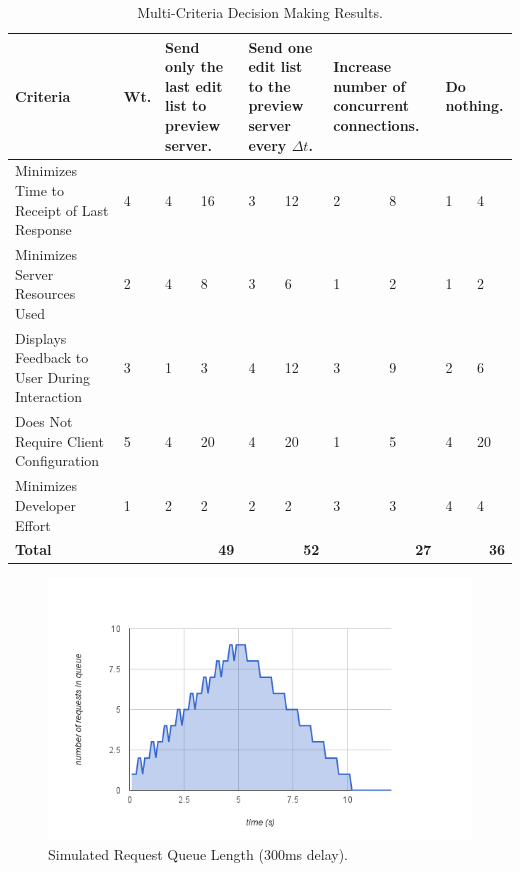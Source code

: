\documentclass[se,resubmit]{uw-wkrpt}
\begin{document}
\begin{table}
  \caption{Multi-Criteria Decision Making Results.}
  \label{tbl:mcdm}
  \centering
  \begin{tabular}{|p{2.0cm}|p{1.0cm}|p{1.25cm}|p{1.25cm}|p{1.25cm}|p{1.25cm}|
                                     p{1.25cm}|p{1.25cm}|p{1.25cm}|p{1.25cm}|}
    \hline
    \textbf{Criteria} &
    \textbf{Wt.} &
    \multicolumn{2}{|p{2.5cm}|}{\textbf{Send only the last edit list to preview
    server.}} &
    \multicolumn{2}{|p{2.5cm}|}{\textbf{Send one edit list to the preview
    server every $\Delta t$.}} &
    \multicolumn{2}{|p{2.5cm}|}{\textbf{Increase number of concurrent
    connections.}} &
    \multicolumn{2}{|p{2.5cm}|}{\textbf{Do nothing.}} \\
    \hline\hline
    Minimizes Time to Receipt of Last Response &
       4 &  4 & 16 &  3 & 12 &  2 &  8 &  1 &  4 \\
    \hline
    Minimizes Server Resources Used &
       2 &  4 &  8 &  3 &  6 &  1 &  2 &  1 &  2 \\
    \hline
    Displays Feedback to User During Interaction &
       3 &  1 &  3 &  4 & 12 &  3 &  9 &  2 &  6 \\
    \hline
    Does Not Require Client Configuration &
       5 &  4 & 20 &  4 & 20 &  1 &  5 &  4 & 20 \\
    \hline
    Minimizes Developer Effort &
       1 &  2 &  2 &  2 &  2 &  3 &  3 &  4 &  4 \\
    \hline
    \hline
    \textbf{Total} &
      &
      \multicolumn{2}{|r|}{\textbf{49}} &
      \multicolumn{2}{|r|}{\textbf{52}} &
      \multicolumn{2}{|r|}{\textbf{27}} &
      \multicolumn{2}{|r|}{\textbf{36}} \\
    \hline
  \end{tabular}
\end{table}

\begin{figure}
  \centering
  \includegraphics[width=6.25in]{sim-300ms}
  \caption{Simulated Request Queue Length (300ms delay).}
  \label{fig:sim-300ms}
\end{figure}
\end{document}
